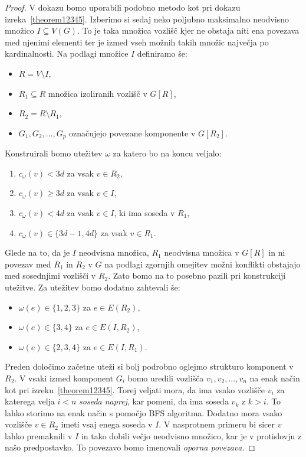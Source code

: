 \documentclass[12pt,a4paper,twoside]{article}
\theoremstyle{definition} %
\theoremstyle{plain} %
\numberwithin{equation}{section}  %
\begin{document}
\begin{proof}
V dokazu bomo uporabili podobno metodo kot pri dokazu izreka~\ref{theorem12345}. Izberimo si sedaj neko poljubno maksimalno neodvisno množico $ I \subseteq V(G)$. To je taka množica vozlišč kjer ne obstaja niti ena povezava med njenimi elementi ter je izmed vseh možnih takih množic največja po kardinalnosti. Na podlagi množice $I$ definiramo še:
\begin{itemize}
\item $R = V \setminus I$,
\item $R_1 \subseteq R$ množica izoliranih vozlišč v $G[R]$,
\item $R_2 = R \setminus R_1$,
\item $G_1, G_2, \ldots, G_p$ označujejo povezane komponente v $G[R_2]$.
\end{itemize}
Konstruirali bomo utežitev $\omega$ za katero bo na koncu veljalo:
\begin{enumerate}
\item \label{itm:1} $c_{\omega}(v) < 3d $ za vsak $v \in R_2$,
\item \label{itm:2}$c_{\omega}(v) \ge 3d $ za vsak $v \in I$,
\item \label{itm:3}$c_{\omega}(v) < 4d $ za vsak $v \in I$, ki ima soseda v $R_1$,
\item \label{itm:4}$c_{\omega}(v) \in \{3d - 1, 4d\} $ za vsak $v \in R_1$.
\end{enumerate}
Glede na to, da je $I$ neodvisna množica, $R_1$ neodvisna množica v $G[R]$ in ni povezav med $R_1$ in $R_2$ v $G$ na podlagi zgornjih omejitev možni konflikti obstajajo med sosednjimi vozlišči v $R_2$. Zato bomo na to posebno pazili pri konstrukciji utežitve. Za utežitev bomo dodatno zahtevali še:
\begin{itemize}
\item $\omega(e) \in \{1,2,3\}$ za $e \in E(R_2)$,
\item $\omega(e) \in \{3,4\}$ za $e \in E(I, R_2)$,
\item $\omega(e) \in \{2,3,4\}$ za $e \in E(I, R_1)$.
\end{itemize}
Preden določimo začetne uteži si bolj podrobno oglejmo strukturo komponent v $R_2$. V vsaki izmed komponent $G_i$ bomo uredili vozlišča  $v_1, v_2, \ldots, v_n$ na enak način kot pri izreku~\ref{theorem12345}. Torej veljati mora, da ima vsako vozlišče $v_i$ za katerega velja $i < n$ \textit{soseda naprej}, kar pomeni, da ima soseda $v_k$ z $ k > i$. To lahko storimo na enak način s pomočjo BFS algoritma. Dodatno mora vsako vozlišče $v \in R_2$ imeti vsaj enega soseda v $I$. V nasprotnem primeru bi sicer $v$ lahko premaknili v $I$ in tako dobili večjo neodvisno množico, kar je v protislovju z našo predpostavko. To povezavo bomo imenovali \textit{oporna povezava}.

\end{proof}
\end{document}
